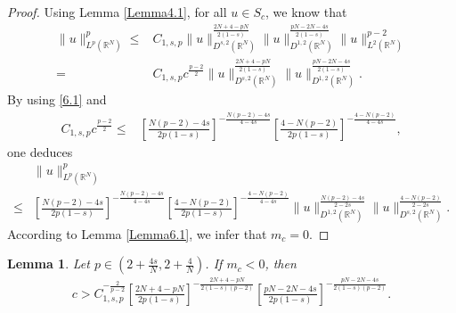 \documentclass[12pt,a4paper,reqno]{amsart}
\numberwithin{equation}{section}
\newtheorem{lemma}{Lemma}[section]
\begin{document}
\begin{proof}
Using Lemma \ref{Lemma4.1}, for all $u\in S_{c}$, we know that
\begin{equation}\label{6.1}
\begin{aligned}
\|u\|_{L^{p}(\mathbb{R}^{N})}^{p}
\leqslant& C_{1,s,p}
\|u\|_{D^{s,2}(\mathbb{R}^{N})}^{\frac{2N+4-pN}{2(1-s)}}
\|u\|_{D^{1,2}(\mathbb{R}^{N})}^{\frac{pN-2N-4s}{2(1-s)}}
\|u\|_{L^{2}(\mathbb{R}^{N})}^{p-2}\\
=& C_{1,s,p}c^{\frac{p-2}{2}}
\|u\|_{D^{s,2}(\mathbb{R}^{N})}^{\frac{2N+4-pN}{2(1-s)}}
\|u\|_{D^{1,2}(\mathbb{R}^{N})}^{\frac{pN-2N-4s}{2(1-s)}}.
\end{aligned}
\end{equation}
By using \eqref{6.1} and
\begin{equation*}
\begin{aligned}
C_{1,s,p}c^{\frac{p-2}{2}}
\leqslant&
\left[
\frac{N(p-2)-4s}{2p(1-s)}
\right]^{-\frac{N(p-2)-4s}{4-4s}}
\left[
\frac{4-N(p-2)}{2p(1-s)}
\right]^{-\frac{4-N(p-2)}{4-4s}},
\end{aligned}
\end{equation*}
one deduces
\begin{equation*}
\begin{aligned}
&\|u\|_{L^{p}(\mathbb{R}^{N})}^{p}\\
\leqslant&
\left[
\frac{N(p-2)-4s}{2p(1-s)}
\right]^{-\frac{N(p-2)-4s}{4-4s}}
\left[
\frac{4-N(p-2)}{2p(1-s)}
\right]^{-\frac{4-N(p-2)}{4-4s}}
\|u\|_{D^{1,2}(\mathbb{R}^{N})}^{\frac{N(p-2)-4s}{2-2s}}
\|u\|_{D^{s,2}(\mathbb{R}^{N})}^{\frac{4-N(p-2)}{2-2s}}.
\end{aligned}
\end{equation*}
According to Lemma \ref{Lemma6.1}, we infer that $m_{c}=0$.
\end{proof}


\begin{lemma}\label{Lemma6.3}
Let $p\in(2+\frac{4s}{N},2+\frac{4}{N})$.
If $m_{c}<0$, then
\begin{equation*}
\begin{aligned}
c>C_{1,s,p}^{-\frac{2}{p-2}}
\left[
\frac{2N+4-pN}{2p(1-s)}
\right]^{-\frac{2N+4-pN}{2(1-s)(p-2)}}
\left[
\frac{pN-2N-4s}{2p(1-s)}
\right]^{-\frac{pN-2N-4s}{2(1-s)(p-2)}}.
\end{aligned}
\end{equation*}
\end{lemma}
\end{document}
